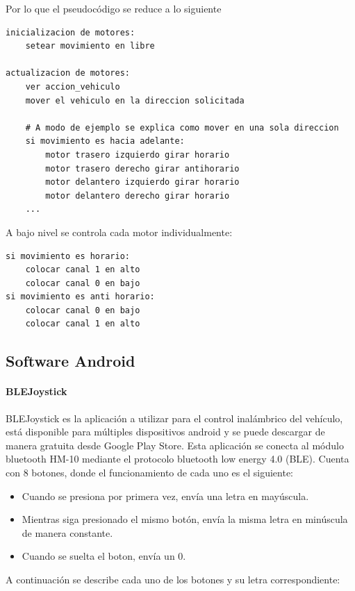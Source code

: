 Por lo que el pseudocódigo se reduce a lo siguiente

\begin{Verbatim}
inicializacion de motores:
	setear movimiento en libre

actualizacion de motores:
	ver accion_vehiculo
	mover el vehiculo en la direccion solicitada

	# A modo de ejemplo se explica como mover en una sola direccion
	si movimiento es hacia adelante:
		motor trasero izquierdo girar horario
		motor trasero derecho girar antihorario
		motor delantero izquierdo girar horario
		motor delantero derecho girar horario
	...
\end{Verbatim}

A bajo nivel se controla cada motor individualmente:

\begin{Verbatim}
si movimiento es horario:
	colocar canal 1 en alto
	colocar canal 0 en bajo
si movimiento es anti horario:
	colocar canal 0 en bajo
	colocar canal 1 en alto
\end{Verbatim}

\subsection{Software Android}

\paragraph{BLEJoystick}
BLEJoystick es la aplicación a utilizar para el control inalámbrico del
vehículo, está disponible para múltiples dispositivos android y se puede
descargar de manera gratuita desde Google Play Store. Esta aplicación se
conecta al módulo bluetooth HM-10 mediante el protocolo bluetooth low
energy 4.0 (BLE). Cuenta con 8 botones, donde el funcionamiento de cada
uno es el siguiente: 

\begin{itemize}
	\item
	Cuando se presiona por primera vez, envía una letra en mayúscula.
	\item
	Mientras siga presionado el mismo botón, envía la misma letra en
	minúscula de manera constante.
	\item
	Cuando se suelta el boton, envía un 0.
\end{itemize}

A continuación se describe cada uno de los botones y su letra
correspondiente:

